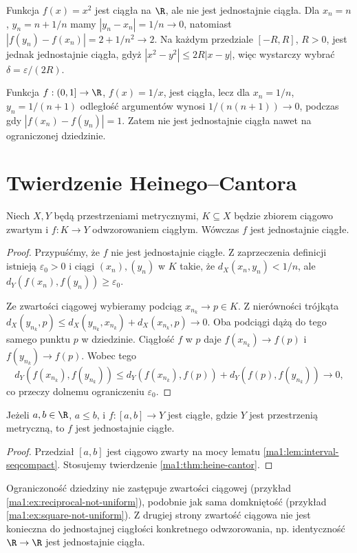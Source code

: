 \begin{przyklad}
\label{ma1:ex:square-not-uniform}
Funkcja $f(x)=x^2$ jest ciągła na $\R$, ale nie jest jednostajnie ciągła. Dla $x_n=n$, $y_n=n+1/n$ mamy $|y_n-x_n|=1/n\to0$, natomiast
$|f(y_n)-f(x_n)|=2+1/n^2\to2$.
Na każdym przedziale $[-R,R]$, $R>0$, jest jednak jednostajnie ciągła, gdyż
$|x^2-y^2|\le2R|x-y|$, więc wystarczy wybrać $\delta=\varepsilon/(2R)$.
\end{przyklad}
\begin{przyklad}
\label{ma1:ex:reciprocal-not-uniform}
Funkcja $f:(0,1]\to\R$, $f(x)=1/x$, jest ciągła, lecz dla $x_n=1/n$, $y_n=1/(n+1)$ odległość argumentów wynosi $1/(n(n+1))\to0$, podczas gdy $|f(x_n)-f(y_n)|=1$. Zatem nie jest jednostajnie ciągła nawet na ograniczonej dziedzinie.
\end{przyklad}

\section{Twierdzenie Heinego--Cantora}
\begin{twierdzenie}
\label{ma1:thm:heine-cantor}
Niech $X,Y$ będą przestrzeniami metrycznymi, $K\subseteq X$ będzie zbiorem ciągowo zwartym i $f:K\to Y$ odwzorowaniem ciągłym. Wówczas $f$ jest jednostajnie ciągłe.
\end{twierdzenie}
\begin{proof}
Przypuśćmy, że $f$ nie jest jednostajnie ciągłe. Z zaprzeczenia definicji istnieją $\varepsilon_0>0$ i ciągi $(x_n),(y_n)$ w $K$ takie, że $d_X(x_n,y_n)<1/n$, ale $d_Y(f(x_n),f(y_n))\ge\varepsilon_0$.

Ze zwartości ciągowej wybieramy podciąg $x_{n_k}\to p\in K$. Z nierówności trójkąta
$d_X(y_{n_k},p)\le d_X(y_{n_k},x_{n_k})+d_X(x_{n_k},p)\to0$.
Oba podciągi dążą do tego samego punktu $p$ w dziedzinie. Ciągłość $f$ w $p$ daje $f(x_{n_k})\to f(p)$ i $f(y_{n_k})\to f(p)$. Wobec tego
\[
 d_Y(f(x_{n_k}),f(y_{n_k}))
 \le d_Y(f(x_{n_k}),f(p))+d_Y(f(p),f(y_{n_k}))\to0,
\]
co przeczy dolnemu ograniczeniu $\varepsilon_0$.
\end{proof}
\begin{wniosek}
\label{ma1:cor:interval-uniform}
Jeżeli $a,b\in\R$, $a\le b$, i $f:[a,b]\to Y$ jest ciągłe, gdzie $Y$ jest przestrzenią metryczną, to $f$ jest jednostajnie ciągłe.
\end{wniosek}
\begin{proof}
Przedział $[a,b]$ jest ciągowo zwarty na mocy lematu \ref{ma1:lem:interval-seqcompact}. Stosujemy twierdzenie \ref{ma1:thm:heine-cantor}.
\end{proof}
Ograniczoność dziedziny nie zastępuje zwartości ciągowej (przykład \ref{ma1:ex:reciprocal-not-uniform}), podobnie jak sama domkniętość (przykład \ref{ma1:ex:square-not-uniform}). Z drugiej strony zwartość ciągowa nie jest konieczna do jednostajnej ciągłości konkretnego odwzorowania, np. identyczność $\R\to\R$ jest jednostajnie ciągła.

